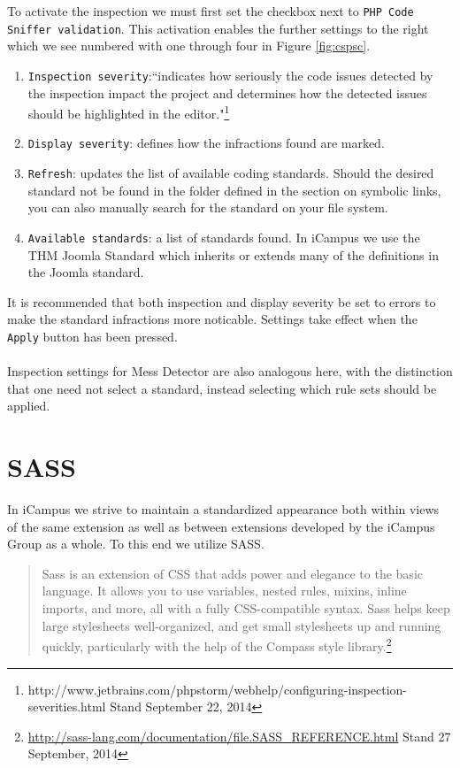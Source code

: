 \noindent
To activate the inspection we must first set the checkbox next to \texttt{PHP Code Sniffer validation}. This activation enables the further settings to the right which we see numbered with one through four in Figure \ref{fig:cspsc}.

\begin{enumerate}
	\item \texttt{Inspection severity}:``indicates how seriously the code issues detected by the inspection impact the project and determines how the detected issues should be highlighted in the editor."\footnote{http://www.jetbrains.com/phpstorm/webhelp/configuring-inspection-severities.html Stand September 22, 2014}
	\item \texttt{Display severity}: defines how the infractions found are marked.
	\item \texttt{Refresh}: updates the list of available coding standards. Should the desired standard not be found in the folder defined in the section on symbolic links, you can also manually search for the standard on your file system.
	\item \texttt{Available standards}: a list of standards found. In iCampus we use the THM Joomla Standard which inherits or extends many of the definitions in the Joomla standard.
\end{enumerate}

\noindent
It is recommended that both inspection and display severity be set to errors to make the standard infractions more noticable. Settings take effect when the \texttt{Apply} button has been pressed.\\
\\
Inspection settings for Mess Detector are also analogous here, with the distinction that one need not select a standard, instead selecting which rule sets should be applied.

\newpage
\section{SASS}

In iCampus we strive to maintain a standardized appearance both within views of the same extension as well as between extensions developed by the iCampus Group as a whole. To this end we utilize SASS.

\begin{quote}
	Sass is an extension of CSS that adds power and elegance to the basic language. It allows you to use variables, nested rules, mixins, inline imports, and more, all with a fully CSS-compatible syntax. Sass helps keep large stylesheets well-organized, and get small stylesheets up and running quickly, particularly with the help of the Compass style library.\footnote{\url{http://sass-lang.com/documentation/file.SASS_REFERENCE.html} Stand 27 September, 2014}
\end{quote}

